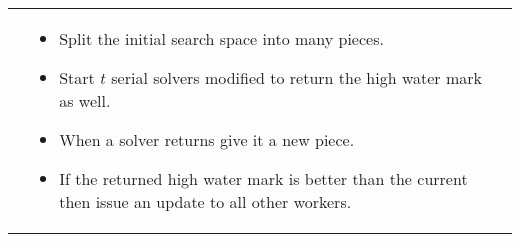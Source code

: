 \documentclass[landscape,a0paper,fontscale=0.32]{baposter} %
\newcommand{\compresslist}{
\setlength{\itemsep}{1pt}
\setlength{\parskip}{0pt}
\setlength{\parsep}{0pt}
}
\begin{document}
\begin{poster}
{\begin{tabu}{p{.316\linewidth}p{.316\linewidth}p{.316\linewidth}}
\begin{itemize}[leftmargin=10pt, topsep=0pt]
    \end{itemize}
    &
    \begin{itemize}[leftmargin=10pt, topsep=0pt]\compresslist
    \item Split the initial search space into many pieces.
    \item Start $t$ serial solvers modified to return the high water mark as well.
    \item When a solver returns give it a new piece.
    \item If the returned high water mark is better than the current then issue an update to all other workers.
    \end{itemize}
  \end{tabu}
}











\end{poster}
\end{document}

